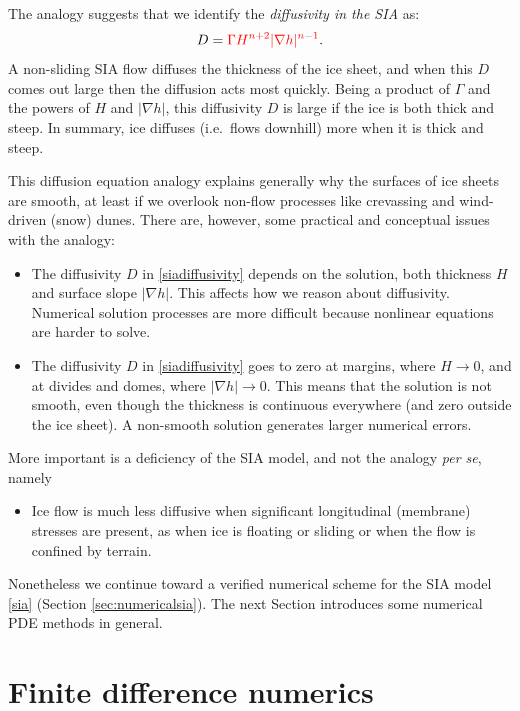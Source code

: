 \documentclass[letterpaper,final,12pt,reqno]{amsart}
\newcommand{\grad}{\nabla}
\begin{document}
The analogy suggests that we identify the \emph{diffusivity in the SIA} as:
\begin{equation}
	D = {\color{red}\Gamma H^{n+2} |\grad h|^{n-1}}.  \label{siadiffusivity}
\end{equation}
A non-sliding SIA flow diffuses the thickness of the ice sheet, and when this $D$ comes out large then the diffusion acts most quickly.  Being a product of $\Gamma$ and the powers of $H$ and $|\grad h|$, this diffusivity $D$ is large if the ice is both thick and steep.  In summary, ice diffuses (i.e.~flows downhill) more when it is thick and steep.

This diffusion equation analogy explains generally why the surfaces of ice sheets are smooth, at least if we overlook non-flow processes like crevassing and wind-driven (snow) dunes.  There are, however, some practical and conceptual issues with the analogy:
\begin{itemize}
\item The diffusivity $D$ in \eqref{siadiffusivity} depends on the solution, both thickness $H$ and surface slope $|\grad h|$.  This affects how we reason about diffusivity.  Numerical solution processes are more difficult because nonlinear equations are harder to solve.
\item The diffusivity $D$ in \eqref{siadiffusivity} goes to zero at margins, where $H\to 0$, and at divides and domes, where $|\grad h|\to 0$.  This means that the solution is not smooth, even though the thickness is continuous everywhere (and zero outside the ice sheet).  A non-smooth solution generates larger numerical errors.
\end{itemize}
More important is a deficiency of the SIA model, and not the analogy \emph{per se}, namely
\begin{itemize}
\item Ice flow is much less diffusive when significant longitudinal (membrane) stresses are present, as when ice is floating or sliding or when the flow is confined by terrain.
\end{itemize}
Nonetheless we continue toward a verified numerical scheme for the SIA model \eqref{sia} (Section \ref{sec:numericalsia}).  The next Section introduces some numerical PDE methods in general.


\section{Finite difference numerics}  \label{sec:fd}
\end{document}
